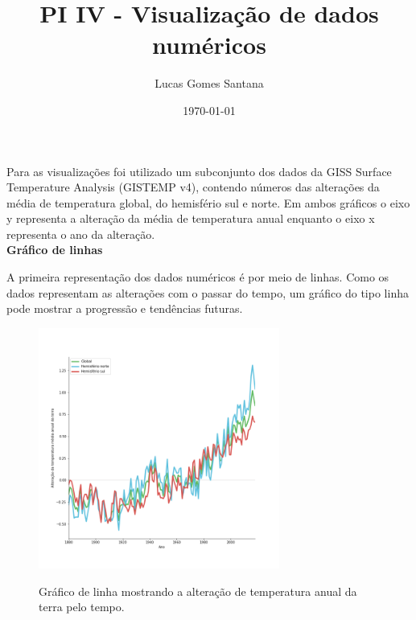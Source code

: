 \documentclass[12pt]{article}
\title{PI IV - Visualização de dados numéricos}
\author{Lucas Gomes Santana}
\date{\today}
\begin{document}
\maketitle

Para as visualizações foi utilizado um subconjunto dos dados da GISS Surface Temperature Analysis (GISTEMP v4)\cite{gistemp}, contendo números das alterações da média de temperatura global, do hemisfério sul e norte. Em ambos gráficos o eixo y representa a alteração da média de temperatura anual enquanto o eixo x representa o ano da alteração.\\


\textbf{\Large Gráfico de linhas}\par
A primeira representação dos dados numéricos é por meio de linhas.  Como os dados representam as alterações com o passar do tempo, um gráfico do tipo linha pode mostrar a progressão e tendências futuras.
\setcounter{figure}{0}
\begin{figure}[H]
\centering
\includegraphics[width = 0.7056\textwidth]{lines.png}
\label{fig:A.1}
\caption{Gráfico de linha mostrando a alteração de temperatura anual da terra pelo tempo.}
\end{figure}
\end{document}
